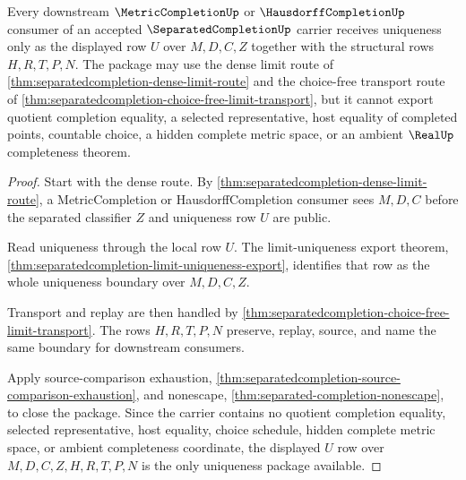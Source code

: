 \begin{theorem}
\label{thm:separatedcompletion-completion-uniqueness-package}
Every downstream $\MetricCompletionUp$ or $\HausdorffCompletionUp$ consumer of an accepted $\SeparatedCompletionUp$ carrier receives uniqueness only as the displayed row $U$ over $M,D,C,Z$ together with the structural rows $H,R,T,P,N$. The package may use the dense limit route of \autoref{thm:separatedcompletion-dense-limit-route} and the choice-free transport route of \autoref{thm:separatedcompletion-choice-free-limit-transport}, but it cannot export quotient completion equality, a selected representative, host equality of completed points, countable choice, a hidden complete metric space, or an ambient $\RealUp$ completeness theorem.
\end{theorem}
\begin{proof}
Start with the dense route. By \autoref{thm:separatedcompletion-dense-limit-route}, a MetricCompletion or HausdorffCompletion consumer sees $M,D,C$ before the separated classifier $Z$ and uniqueness row $U$ are public.

Read uniqueness through the local row $U$. The limit-uniqueness export theorem, \autoref{thm:separatedcompletion-limit-uniqueness-export}, identifies that row as the whole uniqueness boundary over $M,D,C,Z$.

Transport and replay are then handled by \autoref{thm:separatedcompletion-choice-free-limit-transport}. The rows $H,R,T,P,N$ preserve, replay, source, and name the same boundary for downstream consumers.

Apply source-comparison exhaustion, \autoref{thm:separatedcompletion-source-comparison-exhaustion}, and nonescape, \autoref{thm:separated-completion-nonescape}, to close the package. Since the carrier contains no quotient completion equality, selected representative, host equality, choice schedule, hidden complete metric space, or ambient completeness coordinate, the displayed $U$ row over $M,D,C,Z,H,R,T,P,N$ is the only uniqueness package available.
\end{proof}

